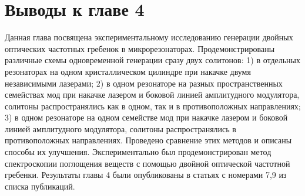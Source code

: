 \section{Выводы к главе 4}
Данная глава посвящена экспериментальному исследованию генерации двойных оптических частотных гребенок в микрорезонаторах. Продемонстрированы различные схемы одновременной генерации сразу двух солитонов: 1) в отдельных резонаторах на одном кристаллическом цилиндре при накачке двумя независимыми лазерами; 2) в одном резонаторе на разных пространственных семействах мод при накачке лазером и боковой линией амплитудного модулятора, солитоны распространялись как в одном, так и в противоположных направлениях; 3) в одном резонаторе на одном семействе мод при накачке лазером и боковой линией амплитудного модулятора, солитоны распространялись в противоположных направлениях. Проведено сравнение этих методов и описаны способы их улучшения. Экспериментально был продемонстрирован метод спектроскопии поглощения веществ с помощью двойной оптической частотной гребенки. Результаты главы 4 были опубликованы в статьях с номерами 7,9 из списка публикаций.



